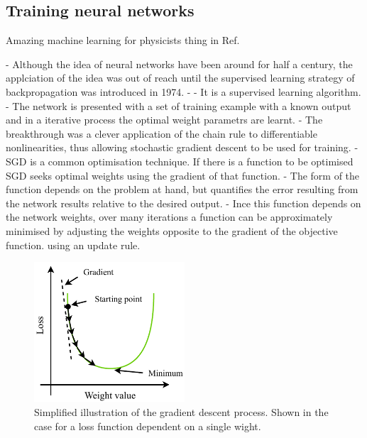 \subsection{Training neural networks} %
\label{sec:cvn_theory_training} %

Amazing machine learning for physicists thing in Ref.~\cite{mehta2019}

- Although the idea of neural networks have been around for half a century, the applciation of the
idea was out of reach until the supervised learning strategy of backpropagation was introduced in
1974.
- \cite{werbos1974}
- It is a supervised learning algorithm.
- The network is presented with a set of training example with a known output and in a iterative
process the optimal weight parametrs are learnt.
- The breakthrough was a clever application of the chain rule to differentiable nonlinearities,
thus allowing stochastic gradient descent to be used for training.
- SGD is a common optimisation technique. If there is a function to be optimised SGD seeks optimal
weights using the gradient of that function.
- The form of the function depends on the problem at hand, but quantifies the error resulting from
the network results relative to the desired output.
- Ince this function depends on the network weights, over many iterations a function can be
approximately minimised by adjusting the weights opposite to the gradient of the objective
function. using an update rule.


\begin{figure} %
    \includegraphics[width=0.5\textwidth]{diagrams/7-cvn/gradient_descent.pdf}
    \caption[Illustration of the gradient descent process.]
    {Simplified illustration of the gradient descent process. Shown in the case for a loss
        function dependent on a single wight.}
    \label{fig:gradient_descent}
\end{figure}

